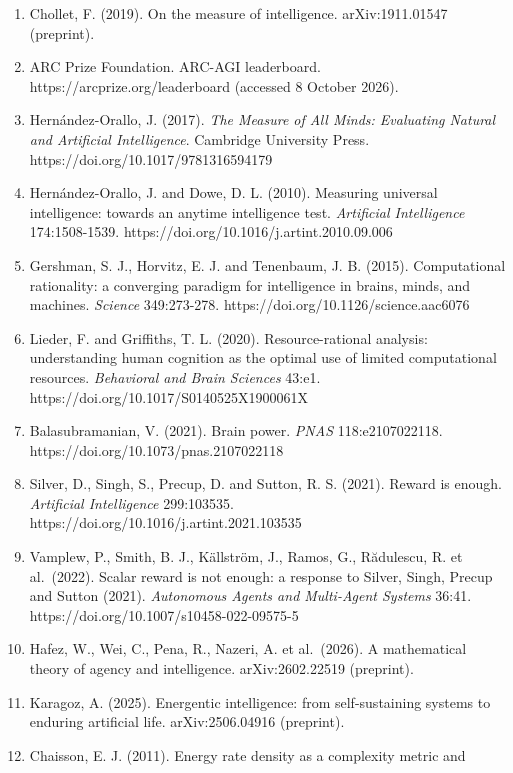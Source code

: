 \documentclass[
  10pt,
]{article}
\begin{document}
\begin{enumerate}
{  Autonomous Mental Development} 2:230-247.
  https://doi.org/10.1109/TAMD.2010.2056368
\item
  Chollet, F. (2019). On the measure of intelligence. arXiv:1911.01547
  (preprint).
\item
  ARC Prize Foundation. ARC-AGI leaderboard.
  https://arcprize.org/leaderboard (accessed 8 October 2026).
\item
  Hernández-Orallo, J. (2017). \emph{The Measure of All Minds:
  Evaluating Natural and Artificial Intelligence}. Cambridge University
  Press. https://doi.org/10.1017/9781316594179
\item
  Hernández-Orallo, J. and Dowe, D. L. (2010). Measuring universal
  intelligence: towards an anytime intelligence test. \emph{Artificial
  Intelligence} 174:1508-1539.
  https://doi.org/10.1016/j.artint.2010.09.006
\item
  Gershman, S. J., Horvitz, E. J. and Tenenbaum, J. B. (2015).
  Computational rationality: a converging paradigm for intelligence in
  brains, minds, and machines. \emph{Science} 349:273-278.
  https://doi.org/10.1126/science.aac6076
\item
  Lieder, F. and Griffiths, T. L. (2020). Resource-rational analysis:
  understanding human cognition as the optimal use of limited
  computational resources. \emph{Behavioral and Brain Sciences} 43:e1.
  https://doi.org/10.1017/S0140525X1900061X
\item
  Balasubramanian, V. (2021). Brain power. \emph{PNAS} 118:e2107022118.
  https://doi.org/10.1073/pnas.2107022118
\item
  Silver, D., Singh, S., Precup, D. and Sutton, R. S. (2021). Reward is
  enough. \emph{Artificial Intelligence} 299:103535.
  https://doi.org/10.1016/j.artint.2021.103535
\item
  Vamplew, P., Smith, B. J., Källström, J., Ramos, G., Rădulescu, R. et
  al.~(2022). Scalar reward is not enough: a response to Silver, Singh,
  Precup and Sutton (2021). \emph{Autonomous Agents and Multi-Agent
  Systems} 36:41. https://doi.org/10.1007/s10458-022-09575-5
\item
  Hafez, W., Wei, C., Pena, R., Nazeri, A. et al.~(2026). A mathematical
  theory of agency and intelligence. arXiv:2602.22519 (preprint).
\item
  Karagoz, A. (2025). Energentic intelligence: from self-sustaining
  systems to enduring artificial life. arXiv:2506.04916 (preprint).
\item
  Chaisson, E. J. (2011). Energy rate density as a complexity metric and

\end{enumerate}
\end{document}
